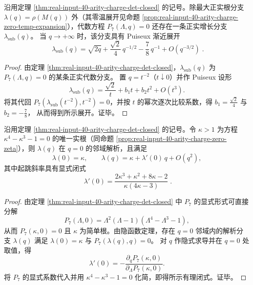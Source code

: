 \begin{proposition}\label{prop:real-input-40-arity-charge-subbranch-puiseux}
沿用定理 \ref{thm:real-input-40-arity-charge-det-closed} 的记号。除最大正实根分支 \(\lambda(q)=\rho(M(q))\) 外（其零温展开见命题 \ref{prop:real-input-40-arity-charge-zero-temp-expansion}），代数方程 \(P_7(\Lambda,q)=0\) 还存在一条正实增长分支 \(\lambda_{\mathrm{sub}}(q)\)。
当 \(q\to+\infty\) 时，该分支具有 Puiseux 渐近展开
\[
\boxed{\;
\lambda_{\mathrm{sub}}(q)=\sqrt{2q}+\frac{\sqrt2}{4}\,q^{-1/2}-\frac78\,q^{-1}+O(q^{-3/2})\; }.
\]
\end{proposition}
\begin{proof}
由定理 \ref{thm:real-input-40-arity-charge-det-closed}，\(\lambda_{\mathrm{sub}}(q)\) 为 \(P_7(\Lambda,q)=0\) 的某条正实代数分支。
置 \(q=t^{-2}\)（\(t\downarrow 0\)）并作 Puiseux 设形
\[
\lambda_{\mathrm{sub}}(q)=\frac{\sqrt2}{t}+b_1t+b_2t^2+O(t^3).
\]
将其代回 \(P_7(\lambda_{\mathrm{sub}}(t^{-2}),t^{-2})=0\)，并按 \(t\) 的幂次逐次比较系数，得
\(
b_1=\frac{\sqrt2}{4}
\)
与
\(
b_2=-\frac78
\)，
从而得到所示展开。证毕。
\end{proof}

\begin{proposition}\label{prop:real-input-40-arity-charge-derivative-q0}
沿用定理 \ref{thm:real-input-40-arity-charge-det-closed} 的记号。令 \(\kappa>1\) 为方程 \(\kappa^4-\kappa^3-1=0\) 的唯一实根（同命题 \ref{prop:real-input-40-arity-charge-zero-zeta}），则 \(\lambda(q)\) 在 \(q=0\) 的邻域解析，且满足
\[
\lambda(0)=\kappa,\qquad
\lambda(q)=\kappa+\lambda'(0)\,q+O(q^2),
\]
其中起跳斜率具有显式闭式
\[
\boxed{\;
\lambda'(0)=\frac{2\kappa^3+\kappa^2+8\kappa-2}{\kappa(4\kappa-3)}\; }.
\]
\end{proposition}
\begin{proof}
由定理 \ref{thm:real-input-40-arity-charge-det-closed} 中 \(P_7\) 的显式形式可直接分解
\[
P_7(\Lambda,0)=\Lambda^2(\Lambda-1)(\Lambda^4-\Lambda^3-1),
\]
从而 \(P_7(\kappa,0)=0\) 且 \(\kappa\) 为简单根。由隐函数定理，存在 \(q=0\) 邻域内的解析分支 \(\lambda(q)\) 满足 \(\lambda(0)=\kappa\) 与 \(P_7(\lambda(q),q)=0\)。
对 \(q\) 作隐式求导并在 \(q=0\) 处取值，得
\[
\lambda'(0)=-\frac{\partial_q P_7(\kappa,0)}{\partial_\Lambda P_7(\kappa,0)}.
\]
将 \(P_7\) 的显式系数代入并用 \(\kappa^4-\kappa^3-1=0\) 化简，即得所示有理闭式。证毕。
\end{proof}
